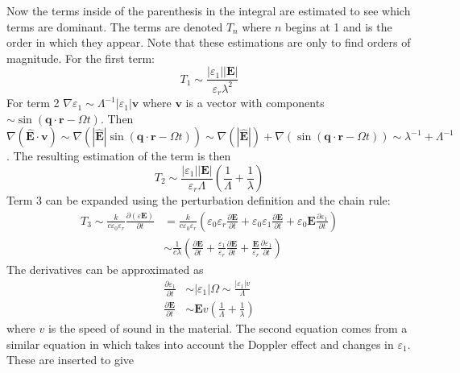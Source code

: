 \documentclass[11pt,twoside]{eitExjobb}
\begin{document}
	Now the terms inside of the parenthesis in the integral are estimated to see which terms are dominant. The terms are denoted $T_n$ where $n$ begins at 1 and is the order in which they appear. Note that these estimations are only to find orders of magnitude. For the first term:
	\begin{equation*}
		T_1 \sim \frac{|\varepsilon_1| |\bm{E}|}{\varepsilon_r \lambda^2}
	\end{equation*}
	For term 2 $\nabla \varepsilon_1 \sim \Lambda^{-1} |\varepsilon_1| \bm{v}$ where $\bm{v}$ is a vector with components $\sim \sin(\bm{q} \cdot \bm{r} - \Omega t)$. Then $\nabla (\bm{\hat{E}} \cdot \bm{v}) \sim \nabla(|\bm{\hat{E}}| \sin(\bm{q} \cdot \bm{r} - \Omega t)) \sim \nabla(|\bm{\hat{E}}|) + \nabla(\sin(\bm{q} \cdot \bm{r} - \Omega t)) \sim \lambda^{-1} + \Lambda^{-1}$. The resulting estimation of the term is then
	\begin{equation*}
		T_2 \sim \frac{|\varepsilon_1| |\bm{E}|}{\varepsilon_r \Lambda} \left( \frac{1}{\Lambda} + \frac{1}{\lambda} \right)
	\end{equation*}
	Term 3 can be expanded using the perturbation definition and the chain rule:
	\begin{equation*}
	\begin{split}
		T_3 \sim \frac{k}{c\varepsilon_0\varepsilon_r} \frac{\partial (\varepsilon \bm{E})}{\partial t} &= \frac{k}{c\varepsilon_0\varepsilon_r} \left( \varepsilon_0\varepsilon_r \frac{\partial \bm{E}}{\partial t} + \varepsilon_0\varepsilon_1 \frac{\partial \bm{E}}{\partial t} + \varepsilon_0\bm{E} \frac{\partial \varepsilon_1}{\partial t}\right) \\
		&\sim \frac{1}{c\lambda} \left( \frac{\partial \bm{E}}{\partial t} + \frac{\varepsilon_1}{\varepsilon_r} \frac{\partial \bm{E}}{\partial t} + \frac{\bm{E}}{\varepsilon_r} \frac{\partial \varepsilon_1}{\partial t} \right)
	\end{split}
	\end{equation*}
	The derivatives can be approximated as
	\begin{align*}
		\frac{\partial \varepsilon_1}{\partial t} &\sim |\varepsilon_1|\Omega \sim \frac{|\varepsilon_1| v}{\Lambda} \\
		\frac{\partial \bm{E}}{\partial t} &\sim \bm{E} v \left( \frac{1}{\Lambda} + \frac{1}{\lambda} \right)
	\end{align*}
	where $v$ is the speed of sound in the material. The second equation comes from a similar equation in \cite{Tatarskii1971} which takes into account the Doppler effect and changes in $\varepsilon_1$. These are inserted to give
\end{document}

